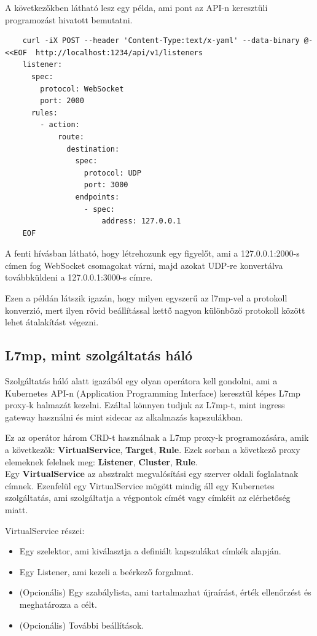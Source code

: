 A következőkben látható lesz egy példa, ami pont az API-n keresztüli programozást
hivatott bemutatni. 

\begin{lstlisting}
	curl -iX POST --header 'Content-Type:text/x-yaml' --data-binary @- <<EOF  http://localhost:1234/api/v1/listeners
	listener:
	  spec:
	    protocol: WebSocket
	    port: 2000
	  rules:
	    - action:
	        route:
	          destination:
	            spec:
  	              protocol: UDP
	              port: 3000
	            endpoints:
	              - spec:
	                  address: 127.0.0.1
	EOF
\end{lstlisting}

A fenti hívásban látható, hogy létrehozunk egy figyelőt, ami a 127.0.0.1:2000-s
címen fog WebSocket csomagokat várni, majd azokat UDP-re konvertálva továbbküldeni 
a 127.0.0.1:3000-s címre.

Ezen a példán látszik igazán, hogy milyen egyszerű az l7mp-vel a protokoll konverzió,
mert ilyen rövid beállítással kettő nagyon különböző protokoll között lehet 
átalakítást végezni.

\subsection{L7mp, mint szolgáltatás háló}

Szolgáltatás háló alatt igazából egy olyan operátora kell gondolni, ami a Kubernetes
API-n (Application Programming Interface) keresztül képes L7mp proxy-k halmazát 
kezelni. Ezáltal könnyen tudjuk az L7mp-t, mint ingress gateway használni és 
mint sidecar az alkalmazás kapszulákban.

Ez az operátor három CRD-t használnak a L7mp proxy-k programozására, amik a következők:
\textbf{VirtualService}, \textbf{Target}, \textbf{Rule}. Ezek sorban a következő proxy 
elemeknek felelnek meg: \textbf{Listener}, \textbf{Cluster}, \textbf{Rule}. \\ 

Egy \textbf{VirtualService} az absztrakt megvalósítási egy szerver oldali foglalatnak címnek. 
Ezenfelül egy VirtualService mögött mindig áll egy Kubernetes szolgáltatás, ami 
szolgáltatja a végpontok címét vagy címkéit az elérhetőség miatt.

VirtualService részei: 

\begin{itemize}
	\item Egy szelektor, ami kiválasztja a definiált kapszulákat címkék alapján.
	\item Egy Listener, ami kezeli a beérkező forgalmat. 
	\item (Opcionális) Egy szabálylista, ami tartalmazhat újraírást, érték ellenőrzést
	és meghatározza a célt. 
	\item (Opcionális) További beállítások.  
\end{itemize}

